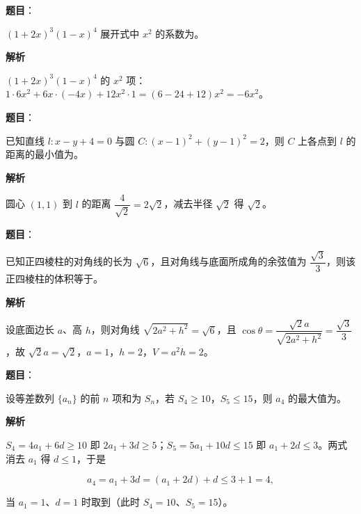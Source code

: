 \begin{answer}

\textbf{题目}：

$(1+2x)^3(1-x)^4$ 展开式中 $x^2$ 的系数为\gkblank{}。

\textbf{解析}

$(1+2x)^3(1-x)^4$ 的 $x^2$ 项：$1\cdot6x^2+6x\cdot(-4x)+12x^2\cdot1=(6-24+12)x^2=-6x^2$。


\end{answer}
\begin{answer}

\textbf{题目}：

已知直线 $l:x-y+4=0$ 与圆 $C:(x-1)^2+(y-1)^2=2$，则 $C$ 上各点到 $l$ 的距离的最小值为\gkblank{}。

\textbf{解析}

圆心 $(1,1)$ 到 $l$ 的距离 $\dfrac{4}{\sqrt2}=2\sqrt2$，减去半径 $\sqrt2$ 得 $\sqrt2$。


\end{answer}
\begin{answer}

\textbf{题目}：

已知正四棱柱的对角线的长为 $\sqrt6$，且对角线与底面所成角的余弦值为 $\dfrac{\sqrt3}3$，则该正四棱柱的体积等于\gkblank{}。

\textbf{解析}

设底面边长 $a$、高 $h$，则对角线 $\sqrt{2a^2+h^2}=\sqrt6$，且 $\cos\theta=\dfrac{\sqrt2a}{\sqrt{2a^2+h^2}}=\dfrac{\sqrt3}3$，故 $\sqrt2a=\sqrt2$，$a=1$，$h=2$，$V=a^2h=2$。


\end{answer}
\begin{answer}

\textbf{题目}：

设等差数列 $\{a_n\}$ 的前 $n$ 项和为 $S_n$，若 $S_4\geqslant10$，$S_5\leqslant15$，则 $a_4$ 的最大值为\gkblank{}。

\textbf{解析}

$S_4=4a_1+6d\geqslant10$ 即 $2a_1+3d\geqslant5$；$S_5=5a_1+10d\leqslant15$ 即 $a_1+2d\leqslant3$。两式消去 $a_1$ 得 $d\leqslant1$，于是

\nopagebreak[4]
\[a_4=a_1+3d=(a_1+2d)+d\leqslant3+1=4,\]

当 $a_1=1$、$d=1$ 时取到（此时 $S_4=10$、$S_5=15$）。


\end{answer}
